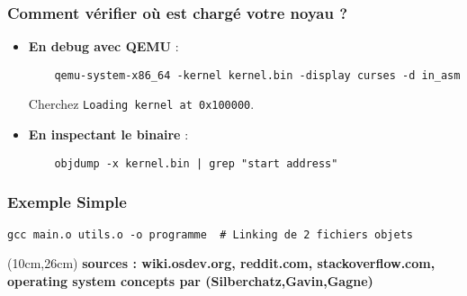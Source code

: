 \documentclass{article}
\begin{document}
\subsubsection*{Comment vérifier où est chargé votre noyau ?}
\begin{itemize}
    \item \textbf{En debug avec QEMU} :
    \begin{verbatim}
    qemu-system-x86_64 -kernel kernel.bin -display curses -d in_asm
    \end{verbatim}
    Cherchez \texttt{Loading kernel at 0x100000}.
    
    \item \textbf{En inspectant le binaire} :
    \begin{verbatim}
    objdump -x kernel.bin | grep "start address"
    \end{verbatim}
\end{itemize}




\subsubsection*{Exemple Simple}
\begin{lstlisting}[language=ld]
    gcc main.o utils.o -o programme  # Linking de 2 fichiers objets
    \end{lstlisting}


\begin{textblock*}{10cm}(10cm,26cm) %
    \textbf{sources : wiki.osdev.org, reddit.com, stackoverflow.com, operating system concepts par (Silberchatz,Gavin,Gagne)}
\end{textblock*}
\end{document}

